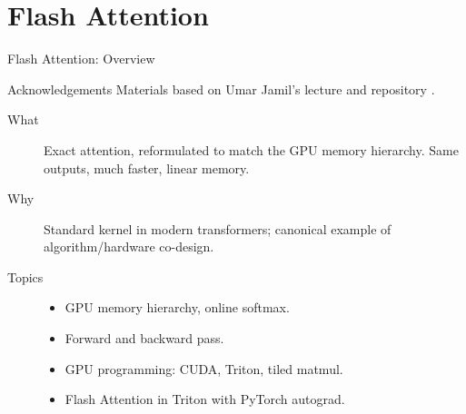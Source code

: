 


\section{Flash Attention}\label{ch:flash}

\begin{frame}{Flash Attention: Overview}

  \begin{block}{Acknowledgements}
    {\footnotesize Materials based on Umar Jamil's lecture \cite{jamil2024flashattention} and repository \cite{jamil2024tritonflash}.}
  \end{block}

  \begin{description}
    \item[What] Exact attention, reformulated to match the GPU memory hierarchy. Same outputs, much faster, linear memory.
    \item[Why] Standard kernel in modern transformers; canonical example of algorithm/hardware co-design.
    \item[Topics]
      \begin{itemize}
        \item GPU memory hierarchy, online softmax.
        \item Forward and backward pass.
        \item GPU programming: CUDA, Triton, tiled matmul.
        \item Flash Attention in Triton with PyTorch autograd.
      \end{itemize}
  \end{description}
\end{frame}


